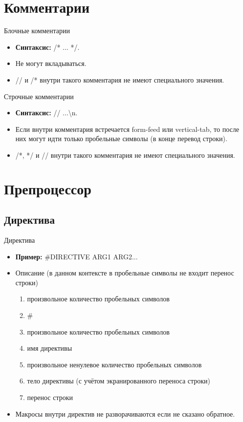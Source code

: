     \section{Комментарии}
    \begin{frame}{Блочные комментарии}
        \begin{itemize}
            \item \textbf{Синтаксис:} /* ... */.
            \item Не могут вкладываться.
            \item // и /* внутри такого комментария не имеют специального значения.
        \end{itemize}
    \end{frame}
    \begin{frame}{Строчные комментарии}
        \begin{itemize}
            \item \textbf{Синтаксис:} // ...\textbackslash{n}.
            \item Если внутри комментария встречается form-feed или vertical-tab, то после них могут идти только пробельные символы (в конце перевод строки).
            \item /*, */ и // внутри такого комментария не имеют специального значения.
        \end{itemize}
    \end{frame}
    \section{Препроцессор}
    \subsection{Директива}
    \begin{frame}{Директива}
        \begin{itemize}
            \item \textbf{Пример:} \#DIRECTIVE ARG1 ARG2...
            \item Описание (в данном контексте в пробельные символы не входит перенос строки)
                \begin{enumerate}
                    \item произвольное количество пробельных символов
                    \item \#
                    \item произвольное количество пробельных символов
                    \item имя директивы
                    \item произвольное ненулевое количество пробельных символов
                    \item тело директивы (с учётом экранированного переноса строки)
                    \item перенос строки
                \end{enumerate}
            \item Макросы внутри директив не разворачиваются если не сказано обратное.
        \end{itemize}
    \end{frame}

